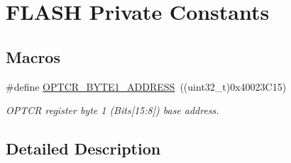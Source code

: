 \hypertarget{group___f_l_a_s_h___private___constants}{}\section{F\+L\+A\+SH Private Constants}
\label{group___f_l_a_s_h___private___constants}
\subsection*{Macros}
\begin{DoxyCompactItemize}
\item 
\mbox{\label{group___f_l_a_s_h___private___constants_ga3c08568a9b3a9d213a70eff8e87117ac}} 
\#define \mbox{\hyperlink{group___f_l_a_s_h___private___constants_ga3c08568a9b3a9d213a70eff8e87117ac}{O\+P\+T\+C\+R\+\_\+\+B\+Y\+T\+E1\+\_\+\+A\+D\+D\+R\+E\+SS}}~((uint32\+\_\+t)0x40023\+C15)
\begin{DoxyCompactList}\small\item\em O\+P\+T\+CR register byte 1 (Bits\mbox{[}15\+:8\mbox{]}) base address. \end{DoxyCompactList}\end{DoxyCompactItemize}


\subsection{Detailed Description}
